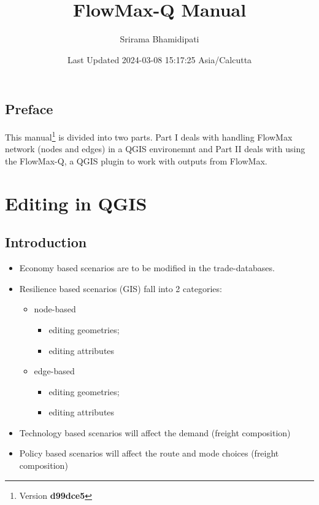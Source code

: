 \documentclass[
]{book}
\title{FlowMax-Q Manual}
\author{Srirama Bhamidipati}
\date{Last Updated 2024-03-08 15:17:25 Asia/Calcutta}
\providecommand{\tightlist}{%
  \setlength{\itemsep}{0pt}\setlength{\parskip}{0pt}}
\begin{document}
\maketitle

{
\setcounter{tocdepth}{1}
\tableofcontents
}
\chapter*{Preface}\label{preface}

This manual\footnote{Version \textbf{d99dce5}} is divided into two parts. Part I deals with handling FlowMax network (nodes and edges) in a QGIS environemnt and Part II deals with using the FlowMax-Q, a QGIS plugin to work with outputs from FlowMax.

\part{Editing in QGIS}\label{part-editing-in-qgis}

\chapter{Introduction}\label{introduction}

\begin{itemize}
\tightlist
\item
  Economy based scenarios are to be modified in the trade-databases.
\item
  Resilience based scenarios (GIS) fall into 2 categories:

  \begin{itemize}
  \tightlist
  \item
    node-based

    \begin{itemize}
    \tightlist
    \item
      editing geometries;
    \item
      editing attributes
    \end{itemize}
  \item
    edge-based

    \begin{itemize}
    \tightlist
    \item
      editing geometries;
    \item
      editing attributes
    \end{itemize}
  \end{itemize}
\item
  Technology based scenarios will affect the demand (freight composition)
\item
  Policy based scenarios will affect the route and mode choices (freight composition)
\end{itemize}
\end{document}
